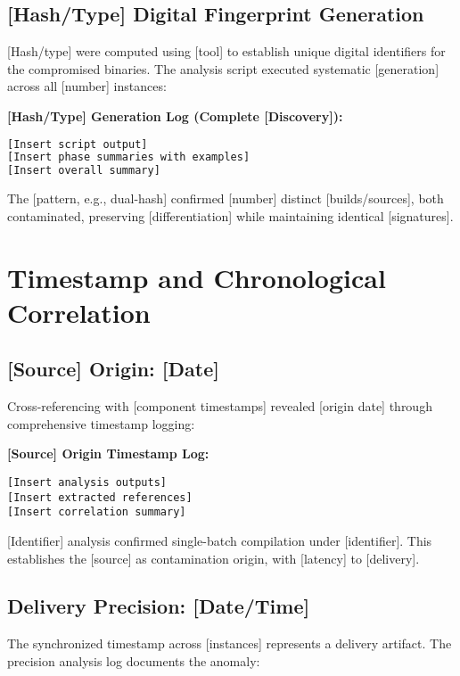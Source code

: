 \documentclass[12pt,a4paper]{article}
\begin{document}
\subsection{[Hash/Type] Digital Fingerprint Generation}
[Hash/type] were computed using [tool] to establish unique digital identifiers for the compromised binaries. The analysis script executed systematic [generation] across all [number] instances:

\textbf{[Hash/Type] Generation Log (Complete [Discovery]):}
\begin{lstlisting}[style=terminal, caption={[Type] Production Build Identification}, language=bash]
[Insert script output]
[Insert phase summaries with examples]
[Insert overall summary]
\end{lstlisting}

The [pattern, e.g., dual-hash] confirmed [number] distinct [builds/sources], both contaminated, preserving [differentiation] while maintaining identical [signatures].

\newpage

\section{Timestamp and Chronological Correlation}

\subsection{[Source] Origin: [Date]}
Cross-referencing with [component timestamps] revealed [origin date] through comprehensive timestamp logging:

\textbf{[Source] Origin Timestamp Log:}
\begin{lstlisting}[style=terminal, caption={[Source] Origin Correlation - [Date]}]
[Insert analysis outputs]
[Insert extracted references]
[Insert correlation summary]
\end{lstlisting}

[Identifier] analysis confirmed single-batch compilation under [identifier]. This establishes the [source] as contamination origin, with [latency] to [delivery].

\subsection{Delivery Precision: [Date/Time]}
The synchronized timestamp across [instances] represents a delivery artifact. The precision analysis log documents the anomaly:
\end{document}
